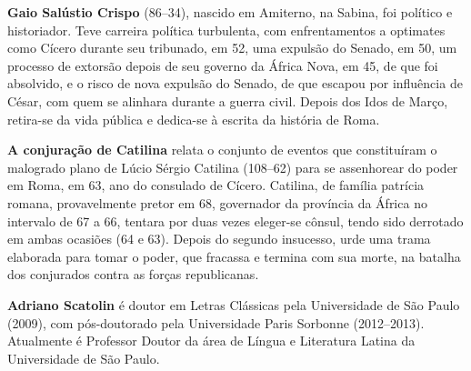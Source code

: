 \textbf{Gaio Salústio Crispo} (86--34), nascido em Amiterno, na Sabina, foi político e historiador. Teve carreira política turbulenta, com enfrentamentos a optimates como Cícero durante seu tribunado, em 52, uma expulsão do Senado, em 50, um processo de extorsão depois de seu governo da África Nova, em 45, de que foi absolvido, e o risco de nova expulsão do Senado, de que escapou por influência de César, com quem se alinhara durante a guerra civil. Depois dos Idos de Março, retira-se da vida pública e dedica-se à escrita da história de Roma.


\textbf{A conjuração de Catilina} relata o conjunto de eventos que constituíram o malogrado plano de Lúcio
Sérgio Catilina (108--62) para se assenhorear do poder em Roma, em 63,
ano do consulado de Cícero. Catilina, de família patrícia romana,
provavelmente pretor em 68, governador da província da África no intervalo
de 67 a 66, tentara por duas vezes eleger-se cônsul, tendo sido derrotado
em ambas ocasiões (64 e 63). Depois do segundo insucesso, urde uma trama elaborada
para tomar o poder, que fracassa e termina com sua morte, na batalha dos conjurados contra as forças republicanas.


\textbf{Adriano Scatolin} é doutor em Letras Clássicas pela
Universidade de São Paulo (2009), com pós-doutorado pela Universidade Paris
 Sorbonne (2012--2013). Atualmente é Professor Doutor da área de Língua e Literatura Latina da Universidade de
São Paulo.

